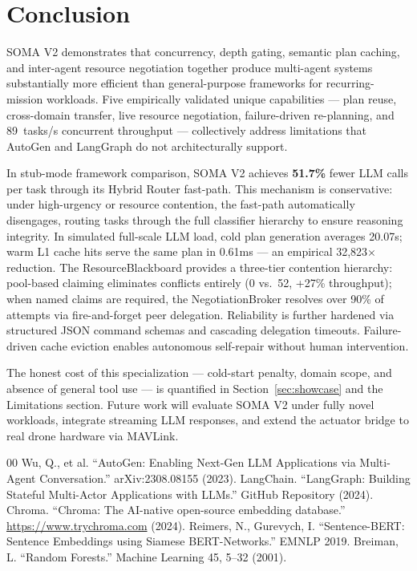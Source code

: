 \documentclass[conference]{IEEEtran}
\begin{document}
\section{Conclusion}

SOMA V2 demonstrates that concurrency, depth gating, semantic plan caching, and
inter-agent resource negotiation together produce multi-agent systems substantially
more efficient than general-purpose frameworks for recurring-mission workloads.
Five empirically validated unique capabilities --- plan reuse, cross-domain transfer,
live resource negotiation, failure-driven re-planning, and 89~tasks/s concurrent
throughput --- collectively address limitations that AutoGen and LangGraph do not
architecturally support.

In stub-mode framework comparison, SOMA V2 achieves \textbf{51.7\%}
fewer LLM calls per task through its Hybrid Router fast-path. This mechanism is
conservative: under high-urgency or resource contention, the fast-path automatically
disengages, routing tasks through the full classifier hierarchy to ensure reasoning
integrity. In simulated full-scale LLM load, cold plan generation averages 20.07s; warm L1 cache
hits serve the same plan in 0.61ms --- an empirical 32,823$\times$ reduction. The ResourceBlackboard provides a three-tier contention hierarchy: pool-based claiming
eliminates conflicts entirely (0 vs.\ 52, +27\% throughput); when named claims are
required, the NegotiationBroker resolves over 90\% of attempts via fire-and-forget peer
delegation. Reliability is further hardened via structured JSON command schemas and
cascading delegation timeouts. Failure-driven
cache eviction enables autonomous self-repair without human intervention.

The honest cost of this specialization --- cold-start penalty, domain scope, and
absence of general tool use --- is quantified in Section~\ref{sec:showcase} and
the Limitations section. Future work will evaluate SOMA V2 under fully novel workloads,
integrate streaming LLM responses, and extend the actuator bridge to real drone
hardware via MAVLink.

\begin{thebibliography}{00}
 Wu, Q., et al. ``AutoGen: Enabling Next-Gen LLM Applications via Multi-Agent Conversation.'' arXiv:2308.08155 (2023).
 LangChain. ``LangGraph: Building Stateful Multi-Actor Applications with LLMs.'' GitHub Repository (2024).
 Chroma. ``Chroma: The AI-native open-source embedding database.'' \url{https://www.trychroma.com} (2024).
 Reimers, N., Gurevych, I. ``Sentence-BERT: Sentence Embeddings using Siamese BERT-Networks.'' EMNLP 2019.
 Breiman, L. ``Random Forests.'' Machine Learning 45, 5--32 (2001).
\end{thebibliography}
\end{document}
